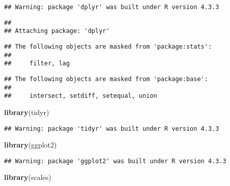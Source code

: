 \documentclass[
]{article}
\author{}
\date{\vspace{-2.5em}}
\newenvironment{Shaded}{\begin{snugshade}}{\end{snugshade}}
\newcommand{\AttributeTok}[1]{\textcolor[rgb]{0.13,0.29,0.53}{#1}}
\newcommand{\ConstantTok}[1]{\textcolor[rgb]{0.56,0.35,0.01}{#1}}
\newcommand{\FunctionTok}[1]{\textcolor[rgb]{0.13,0.29,0.53}{\textbf{#1}}}
\newcommand{\NormalTok}[1]{#1}
\newcommand{\SpecialCharTok}[1]{\textcolor[rgb]{0.81,0.36,0.00}{\textbf{#1}}}
\begin{document}
\begin{Shaded}
\end{Shaded}

\begin{verbatim}
## Warning: package 'dplyr' was built under R version 4.3.3
\end{verbatim}

\begin{verbatim}
## 
## Attaching package: 'dplyr'
\end{verbatim}

\begin{verbatim}
## The following objects are masked from 'package:stats':
## 
##     filter, lag
\end{verbatim}

\begin{verbatim}
## The following objects are masked from 'package:base':
## 
##     intersect, setdiff, setequal, union
\end{verbatim}

\begin{Shaded}
\begin{Highlighting}[]
\FunctionTok{library}\NormalTok{(tidyr)}
\end{Highlighting}
\end{Shaded}

\begin{verbatim}
## Warning: package 'tidyr' was built under R version 4.3.3
\end{verbatim}

\begin{Shaded}
\begin{Highlighting}[]
\FunctionTok{library}\NormalTok{(ggplot2)}
\end{Highlighting}
\end{Shaded}

\begin{verbatim}
## Warning: package 'ggplot2' was built under R version 4.3.3
\end{verbatim}

\begin{Shaded}
\begin{Highlighting}[]
\FunctionTok{library}\NormalTok{(scales)}
\end{Highlighting}
\end{Shaded}
\end{document}
